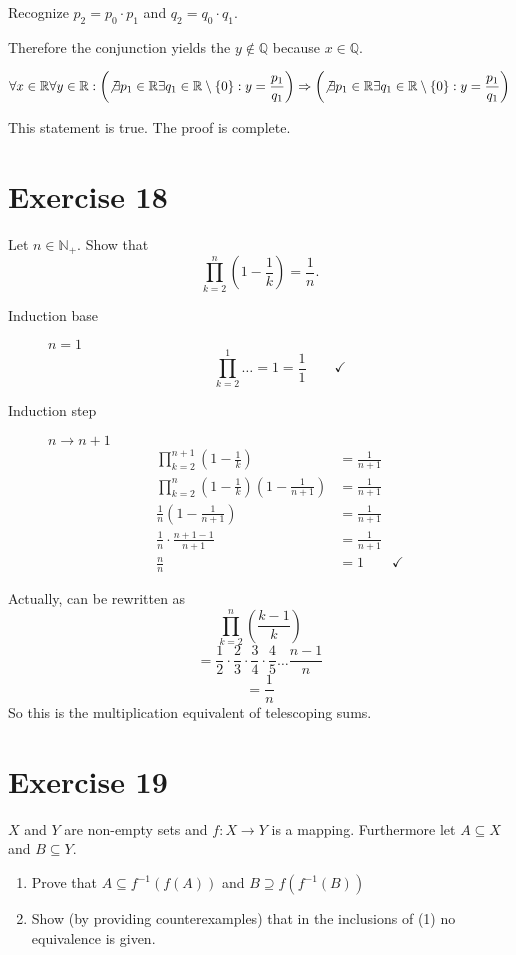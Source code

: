 \documentclass[a4paper]{article}
\theoremstyle{definition}
\newcommand\set[1]{\left\{#1\right\}}
\begin{document}
Recognize $p_2 = p_0 \cdot p_1$ and $q_2 = q_0 \cdot q_1$.

Therefore the conjunction yields the $y \not\in \mathbb Q$ because $x \in \mathbb Q$.

\[
    \forall x \in \mathbb R \forall y \in \mathbb R:
    \left(\not\exists p_1 \in \mathbb R \exists q_1 \in \mathbb R \setminus \set{0}: y = \frac{p_1}{q_1}\right) \Rightarrow
    \left(\not\exists p_1 \in \mathbb R \exists q_1 \in \mathbb R \setminus \set{0}: y = \frac{p_1}{q_1}\right)
\]

This statement is true. The proof is complete.

\section{Exercise 18}
\begin{ex}
  Let $n \in \mathbb{N}_+$. Show that
  \[ \prod_{k=2}^n \left(1 - \frac1k\right) = \frac1n . \]
\end{ex}

\begin{description}
  \item[Induction base] $n = 1$
    \[ \prod_{k=2}^1 \dots = 1 = \frac11 \qquad\checkmark \]
  \item[Induction step] $n \rightarrow n + 1$
    \begin{align*}
      \prod_{k=2}^{n+1} \left(1 - \frac{1}{k}\right) &= \frac{1}{n+1} \\
      \prod_{k=2}^{n} \left(1 - \frac{1}{k}\right) \left(1 - \frac{1}{n+1}\right) &= \frac{1}{n+1} \\
      \frac 1n \left(1 - \frac{1}{n+1}\right) &= \frac{1}{n+1} \\
      \frac 1n \cdot \frac{n+1-1}{n+1} &= \frac{1}{n+1} \\
      \frac nn &= 1 \qquad\checkmark
    \end{align*}
\end{description}

Actually, can be rewritten as
\[ \prod_{k=2}^n \left(\frac{k-1}{k}\right) \]
\[ = \frac12 \cdot \frac23 \cdot \frac34 \cdot \frac45 \dots \frac{n-1}{n} \]
\[ = \frac1n \]
So this is the multiplication equivalent of telescoping sums.

\section{Exercise 19}

\begin{ex}
  $X$ and $Y$ are non-empty sets and $f: X \rightarrow Y$ is a mapping.
  Furthermore let $A \subseteq X$ and $B \subseteq Y$.
  \begin{enumerate}
    \item Prove that $A \subseteq f^{-1}(f(A))$ and $B \supseteq f(f^{-1}(B))$
    \item Show (by providing counterexamples) that in the inclusions of (1)
      no equivalence is given.
  \end{enumerate}
\end{ex}
\end{document}
